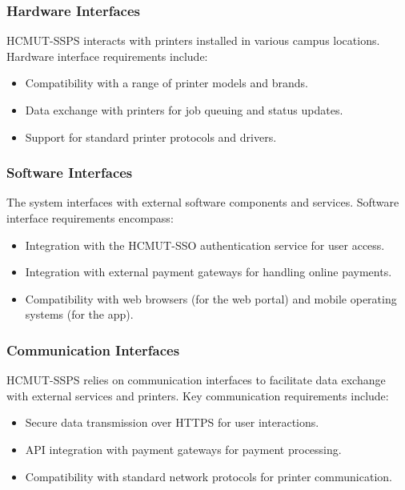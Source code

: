 \documentclass{article}
\begin{document}
\subsubsection{Hardware Interfaces}
HCMUT-SSPS interacts with printers installed in various campus locations. Hardware interface requirements include:

\begin{itemize}
    \item Compatibility with a range of printer models and brands.
    \item Data exchange with printers for job queuing and status updates.
    \item Support for standard printer protocols and drivers.
\end{itemize}

\subsubsection{Software Interfaces}
The system interfaces with external software components and services. Software interface requirements encompass:

\begin{itemize}
    \item Integration with the HCMUT-SSO authentication service for user access.
    \item Integration with external payment gateways for handling online payments.
    \item Compatibility with web browsers (for the web portal) and mobile operating systems (for the app).
\end{itemize}

\subsubsection{Communication Interfaces}
HCMUT-SSPS relies on communication interfaces to facilitate data exchange with external services and printers. Key communication requirements include:

\begin{itemize}
    \item Secure data transmission over HTTPS for user interactions.
    \item API integration with payment gateways for payment processing.
    \item Compatibility with standard network protocols for printer communication.
\end{itemize}
\end{document}
